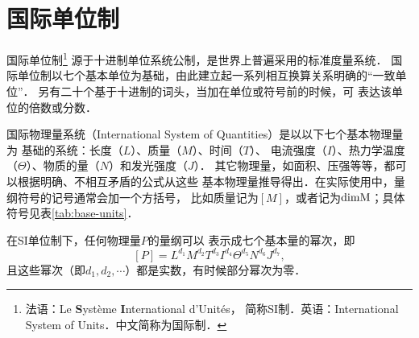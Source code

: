 \section{国际单位制}
国际单位制{\footnote{法语：Le {\bf S}ystème {\bf I}nternational d'Unités，
        简称SI制．英语：International System of Units．中文简称为国际制．}}
源于十进制单位系统{\kaishu 公制}，是世界上普遍采用的标准度量系统．
国际单位制以七个基本单位为基础，由此建立起一系列相互换算关系明确的“一致单位”．
另有二十个基于十进制的词头，当加在单位或符号前的时候，可
表达该单位的倍数或分数．


国际物理量系统（International System of Quantities）是以以下七个基本物理量为
基础的系统：长度（$\si{L}$）、质量（$\si{M}$）、时间（$\si{T}$）、
电流强度（$\si{I}$）、热力学温度（$\Theta$）、物质的量（$\si{N}$）和发光强度（$\si{J}$）．
其它物理量，如面积、压强等等，都可以根据明确、不相互矛盾的公式从这些
基本物理量推导得出．在实际使用中，量纲符号的记号通常会加一个方括号，
比如质量记为$[\si{M}]$，或者记为$\rm{dim} \si{M}$；具体符号见表\ref{tab:base-units}．


在SI单位制下，任何物理量$P$的量纲可以
表示成七个基本量的幂次，即
\begin{equation} \label{chunit-dim:eqn_si-dim}
    [P]=\si{L}^{d_1} \si{M}^{d_2} \si{T}^{d_3} \si{I}^{d_4} \Theta^{d_5} \si{N}^{d_6} \si{J}^{d_7} ,
\end{equation}
且这些幂次（即$d_1,d_2,\cdots$）都是实数，有时候部分幂次为零．



